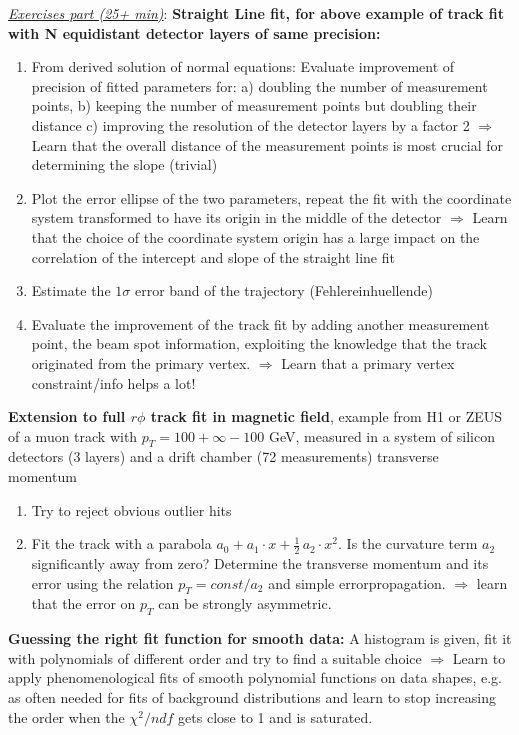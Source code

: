 \documentclass[12pt]{article}
\begin{document}
{\em \underline{Exercises part (25+ min)}}:
{\bf Straight Line fit, for above example of track fit
with N equidistant detector layers of same precision:}
\begin{enumerate}
\item From derived solution of normal equations:
Evaluate improvement of precision of fitted parameters
for: a) doubling the number of measurement points,
b) keeping the number of measurement points but doubling
   their distance
c) improving the resolution of the detector layers by
   a factor 2 
$\Rightarrow$ Learn that the overall distance of the measurement 
points is most crucial for determining the slope (trivial)
\item
Plot the error ellipse of the two parameters, repeat the
fit with the coordinate system transformed to have its
origin in the middle of the detector
$\Rightarrow$ Learn that the choice of the coordinate
system origin has a large impact on the correlation of
the intercept and slope of the straight line fit
\item
Estimate the $1\sigma$ error band of the trajectory 
(Fehlereinhuellende) 
\item 
Evaluate the improvement of the track fit by adding
another measurement point, the beam spot information,
exploiting the knowledge that the track originated
from the primary vertex.
$\Rightarrow$ Learn that a primary vertex constraint/info
helps a lot!
\end{enumerate}
{\bf Extension to full $r\phi$ track fit in magnetic field}, example
from H1 or ZEUS of a muon track with $p_T = 100+\infty - 100$ GeV,
measured in a system of silicon detectors (3 layers) and
a drift chamber (72 measurements)  
transverse momentum
\begin{enumerate}
\item
Try to reject obvious outlier hits
\item
Fit the track with a parabola
$a_0 + a_1 \cdot x + \frac{1}{2} \, a_2 \cdot x^2$.
Is the curvature term $a_2$ significantly
away from zero?
Determine the
transverse momentum and its error
using the relation $p_T = const/a_2$ and simple
errorpropagation.
$\Rightarrow$ learn that the error on $p_T$ can
be strongly asymmetric.
\end{enumerate}
%
{\bf Guessing the right fit function for smooth data:}
A histogram is given, fit it with polynomials of
different order and try to find a suitable choice
$\Rightarrow$ Learn to apply phenomenological
fits of smooth polynomial functions on data shapes,
e.g. as often needed for fits of background 
distributions and learn to stop increasing
the order when the $\chi^2/ndf$ gets close to 1
and is saturated.
% 
%
%
%
%
%
%
%
%
\end{document}
